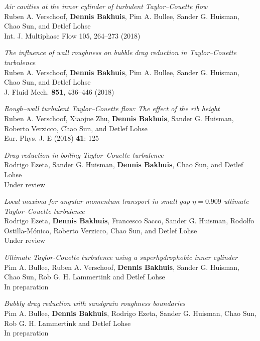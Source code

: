 \begin{packeditemize}
\item \textit{Air cavities at the inner cylinder of turbulent Taylor--Couette flow} \\ 
Ruben A. Verschoof, \textbf{Dennis Bakhuis}, Pim A. Bullee, Sander G.
Huisman, Chao Sun, and Detlef Lohse \\
Int. J. Multiphase Flow 105, 264--273 (2018)

\item \textit{The influence of wall roughness on bubble drag reduction in
    Taylor--Couette turbulence} \\ 
Ruben A. Verschoof, \textbf{Dennis Bakhuis}, Pim A. Bullee, Sander G. Huisman, Chao Sun, and Detlef Lohse \\
J. Fluid Mech. \textbf{851},  436--446 (2018)

\item \textit{Rough--wall turbulent Taylor--Couette flow: The effect of the
    rib height} \\ 
Ruben A. Verschoof, Xiaojue Zhu, \textbf{Dennis Bakhuis}, Sander G. Huisman,
Roberto Verzicco, Chao Sun, and Detlef Lohse \\
Eur. Phys. J. E (2018) \textbf{41}: 125

\item \textit{Drag reduction in boiling Taylor--Couette turbulence} \\ 
Rodrigo Ezeta, Sander G. Huisman, \textbf{Dennis Bakhuis}, Chao Sun, and Detlef Lohse \\
Under review

\item \textit{Local maxima for angular momentum transport in small gap
    $\eta=0.909$ ultimate Taylor--Couette turbulence} \\ 
Rodrigo Ezeta, \textbf{Dennis Bakhuis}, Francesco Sacco, Sander G. Huisman,
Rodolfo Ostilla-M\'onico, Roberto Verzicco, Chao Sun, and Detlef Lohse \\
Under review

\item \textit{Ultimate Taylor-Couette turbulence using a superhydrophobic inner cylinder} \\ 
Pim A. Bullee, Ruben A. Verschoof, \textbf{Dennis Bakhuis}, Sander G. Huisman,
Chao Sun, Rob G. H. Lammertink and Detlef Lohse \\
In preparation

\item \textit{Bubbly drag reduction with sandgrain roughness boundaries} \\ 
Pim A. Bullee, \textbf{Dennis Bakhuis}, Rodrigo Ezeta, Sander G. Huisman,
Chao Sun, Rob G. H. Lammertink and Detlef Lohse \\
In preparation
\end{packeditemize}

